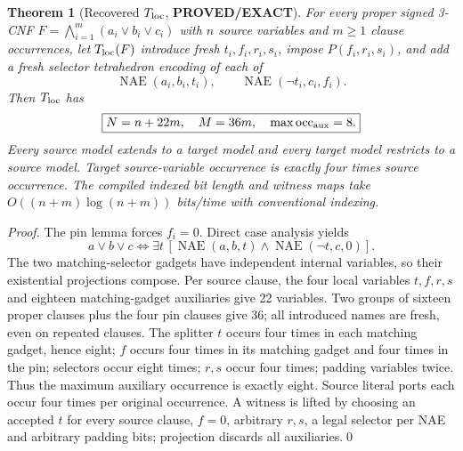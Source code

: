 \documentclass[11pt]{article}
\newtheorem{theorem}{Theorem}
\newcommand{\NAE}{\operatorname{NAE}}
\newcommand{\EXACT}{\textbf{PROVED/EXACT}}
\begin{document}
\begin{theorem}[Recovered $T_{\rm loc}$, \EXACT]
For every proper signed 3-CNF $F=\bigwedge_{i=1}^m(a_i\vee b_i\vee c_i)$
with $n$ source variables and $m\ge1$ clause occurrences, let $T_{\rm loc}(F)$
introduce fresh $t_i,f_i,r_i,s_i$, impose $P(f_i,r_i,s_i)$, and add a fresh
selector tetrahedron encoding of each of
\[
 \NAE(a_i,b_i,t_i),\qquad\NAE(\neg t_i,c_i,f_i).
\]
Then $T_{\rm loc}$ has
\[
\boxed{N=n+22m,\quad M=36m,\quad \max\operatorname{occ}_{\rm aux}=8.}
\]
Every source model extends to a target model and every target model
restricts to a source model.  Target source-variable occurrence is exactly
four times source occurrence.  The compiled indexed bit length and witness
maps take $O((n+m)\log(n+m))$ bits/time with conventional indexing.
\end{theorem}
\begin{proof}
The pin lemma forces $f_i=0$.  Direct case analysis yields
\[
 a\vee b\vee c\iff\exists t\,[\NAE(a,b,t)\land\NAE(\neg t,c,0)].
\]
The two matching-selector gadgets have independent internal variables,
so their existential projections compose.  Per source clause, the four
local variables $t,f,r,s$ and eighteen matching-gadget auxiliaries give
22 variables.  Two groups of sixteen proper clauses plus the four pin
clauses give 36; all introduced names are fresh, even on repeated clauses.
The splitter $t$ occurs four times in each matching gadget, hence eight;
$f$ occurs four times in its matching gadget and four times in the pin;
selectors occur eight times; $r,s$ occur four times; padding variables twice.
Thus the maximum auxiliary occurrence is exactly eight.  Source literal
ports each occur four times per original occurrence.
A witness is lifted by choosing an accepted $t$ for every source clause,
$f=0$, arbitrary $r,s$, a legal selector per NAE and arbitrary padding bits;
projection discards all auxiliaries.\qed
\end{proof}
\end{document}
